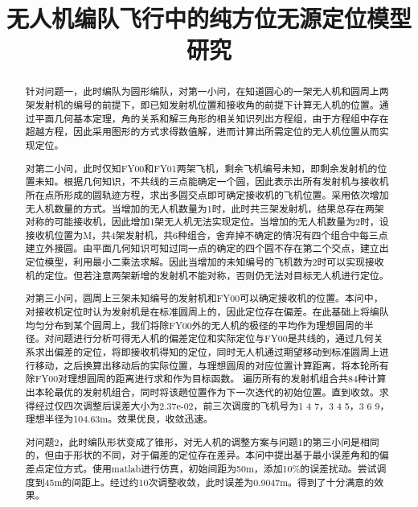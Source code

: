 \documentclass{cumcmthesis}
\title{无人机编队飞行中的纯方位无源定位模型研究}
\begin{document}
 \maketitle
 \begin{abstract}

针对问题一，此时编队为圆形编队，对第一小问，在知道圆心的一架无人机和圆周上两架发射机的编号的前提下，即已知发射机位置和接收角的前提下计算无人机的位置。通过平面几何基本定理，角的关系和解三角形的相关知识列出方程组，由于方程组中存在超越方程，因此采用图形的方式求得数值解，进而计算出所需定位的无人机位置从而实现定位。

对第二小问，此时仅知FY00和FY01两架飞机，剩余飞机编号未知，即剩余发射机的位置未知。根据几何知识，不共线的三点能确定一个圆，因此表示出所有发射机与接收机所在点所形成的圆轨迹方程，求出多圆交点即可确定接收机的飞机位置。采用依次增加无人机数量的方式。当增加的无人机数量为1时，此时共三架发射机，结果总存在两架对称的可能接收机，因此增加1架无人机无法实现定位。当增加的无人机数量为2时，设接收机位置为M，共4架发射机，共6种组合，舍弃掉不确定的情况有四个组合中每三点建立外接圆。由平面几何知识可知过同一点的确定的四个圆不存在第二个交点，建立出定位模型，利用最小二乘法求解。因此当增加的未知编号的飞机数为2时可以实现接收机的定位。但若注意两架新增的发射机不能对称，否则仍无法对目标无人机进行定位。

对第三小问，圆周上三架未知编号的发射机和FY00可以确定接收机的位置。本问中，对接收机定位时认为发射机是在标准圆周上的，因此定位存在偏差。在此基础上将编队均匀分布到某个圆周上，我们将除FY00外的无人机的极径的平均作为理想圆周的半径。对问题进行分析可得无人机的偏差定位和实际定位与FY00是共线的，通过几何关系求出偏差的定位，将即接收机得知的定位，同时无人机通过期望移动到标准圆周上进行移动，之后换算出移动后的实际位置，与理想圆周的对应位置计算距离，将本轮所有除FY00对理想圆周的距离进行求和作为目标函数。 遍历所有的发射机组合共84种计算出本轮最优的发射机组合，同时将该趟位置作为下一次迭代的初始位置。直到收敛。求得经过仅四次调整后误差大小为2.37e-02，前三次调度的飞机号为1	4 7，3 4 5，3	6 9，理想半径为104.63m。效果优良，收敛迅速。

对问题2，此时编队形状变成了锥形，对无人机的调整方案与问题1的第三小问是相同的，但由于形状的不同，对于偏差的定位存在差异。本问中提出基于最小误差角和的偏差点定位方式。使用matlab进行仿真，初始间距为50m，添加10\%的误差扰动。尝试调度到45m的间距上。经过约10次调整收敛，此时误差为0.9047m。得到了十分满意的效果。



\end{abstract}
\end{document}
